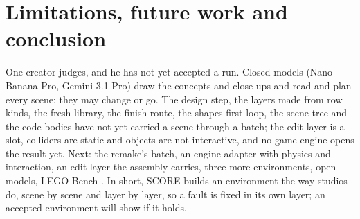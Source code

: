 \section{Limitations, future work and conclusion}\label{limitations-future-work-and-conclusion}

One creator judges, and he has not yet accepted a run. Closed models (Nano Banana Pro, Gemini 3.1 Pro) draw the concepts and close-ups and read and plan every scene; they may change or go. The design step, the layers made from row kinds, the fresh library, the finish route, the shapes-first loop, the scene tree and the code bodies have not yet carried a scene through a batch; the edit layer is a slot, colliders are static and objects are not interactive, and no game engine opens the result yet. Next: the remake's batch, an engine adapter with physics and interaction, an edit layer the assembly carries, three more environments, open models, LEGO-Bench \citep{li2026lego}. In short, SCORE builds an environment the way studios do, scene by scene and layer by layer, so a fault is fixed in its own layer; an accepted environment will show if it holds.
